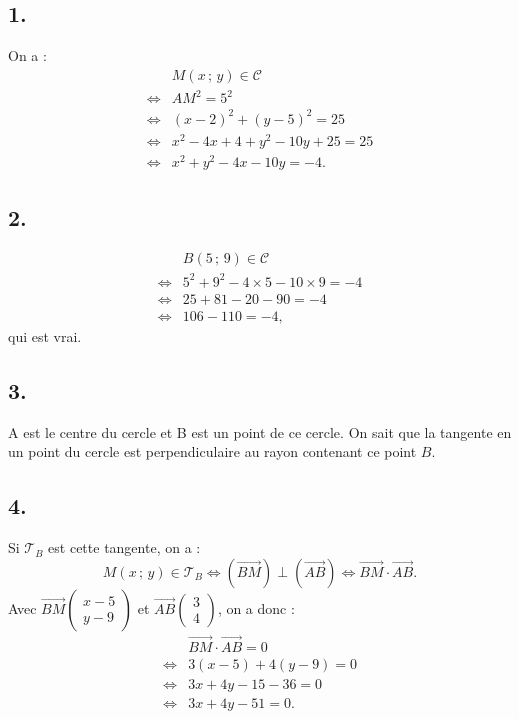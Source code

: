 \subsection*{1.}

On a :
\begin{align*}
&M(x \,;\, y) \in \mathcal{C} \\
\iff &AM^2 = 5^2 \\
\iff &(x - 2)^2 + (y - 5)^2 = 25 \\
\iff &x^2 - 4x + 4 + y^2 - 10y + 25 = 25 \\
\iff &x^2 + y^2 - 4x - 10y = -4.
\end{align*}

\subsection*{2.}

\begin{align*}
&B(5 \,;\, 9) \in \mathcal{C} \\
\iff &5^2 + 9^2 - 4 \times 5 - 10 \times 9 = -4 \\
\iff &25 + 81 - 20 - 90 = -4 \\
\iff &106 - 110 = -4,
\end{align*}
qui est vrai.

\subsection*{3.}

A est le centre du cercle et B est un point de ce cercle. On sait que la tangente en un point du cercle est perpendiculaire au rayon contenant ce point \(B\).

\subsection*{4.}

Si \(\mathcal{T}_B\) est cette tangente, on a :
\[
M(x \,;\, y) \in \mathcal{T}_B \iff (\overrightarrow{BM}) \perp (\overrightarrow{AB}) \iff \overrightarrow{BM} \cdot \overrightarrow{AB}.
\]
Avec \(\overrightarrow{BM} \begin{pmatrix} x - 5 \\ y - 9 \end{pmatrix}\) et \(\overrightarrow{AB} \begin{pmatrix} 3 \\ 4 \end{pmatrix}\), on a donc :
\begin{align*}
&\overrightarrow{BM} \cdot \overrightarrow{AB} = 0 \\
\iff &3(x - 5) + 4(y - 9) = 0 \\
\iff &3x + 4y - 15 - 36 = 0 \\
\iff &3x + 4y - 51 = 0.
\end{align*}

